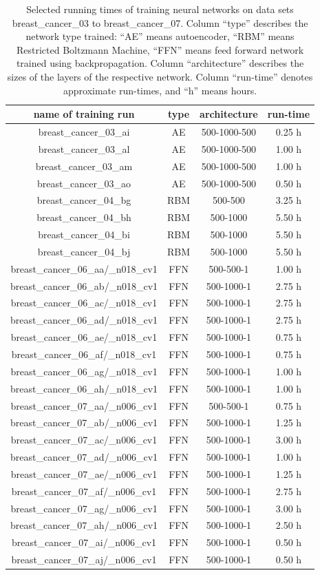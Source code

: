 \begin{table}
\begin{centering}
\begin{tabular}{|c|c|c|c|}
\hline 
name of training run & type & architecture & run-time\tabularnewline
\hline 
\hline 
breast\_cancer\_03\_ai & AE & 500-1000-500 & 0.25 h\tabularnewline
\hline 
breast\_cancer\_03\_al & AE & 500-1000-500 & 1.00 h\tabularnewline
\hline 
breast\_cancer\_03\_am & AE & 500-1000-500 & 1.00 h\tabularnewline
\hline 
breast\_cancer\_03\_ao & AE & 500-1000-500 & 0.50 h\tabularnewline
\hline 
breast\_cancer\_04\_bg & RBM & 500-500 & 3.25 h\tabularnewline
\hline 
breast\_cancer\_04\_bh & RBM & 500-1000 & 5.50 h\tabularnewline
\hline 
breast\_cancer\_04\_bi & RBM & 500-1000 & 5.50 h\tabularnewline
\hline 
breast\_cancer\_04\_bj & RBM & 500-1000 & 5.50 h\tabularnewline
\hline 
breast\_cancer\_06\_aa/\_n018\_cv1 & FFN & 500-500-1 & 1.00 h\tabularnewline
\hline 
breast\_cancer\_06\_ab/\_n018\_cv1 & FFN & 500-1000-1 & 2.75 h\tabularnewline
\hline 
breast\_cancer\_06\_ac/\_n018\_cv1 & FFN & 500-1000-1 & 2.75 h\tabularnewline
\hline 
breast\_cancer\_06\_ad/\_n018\_cv1 & FFN & 500-1000-1 & 2.75 h\tabularnewline
\hline 
breast\_cancer\_06\_ae/\_n018\_cv1 & FFN & 500-1000-1 & 0.75 h\tabularnewline
\hline 
breast\_cancer\_06\_af/\_n018\_cv1 & FFN & 500-1000-1 & 0.75 h\tabularnewline
\hline 
breast\_cancer\_06\_ag/\_n018\_cv1 & FFN & 500-1000-1 & 1.00 h\tabularnewline
\hline 
breast\_cancer\_06\_ah/\_n018\_cv1 & FFN & 500-1000-1 & 1.00 h\tabularnewline
\hline 
breast\_cancer\_07\_aa/\_n006\_cv1 & FFN & 500-500-1 & 0.75 h\tabularnewline
\hline 
breast\_cancer\_07\_ab/\_n006\_cv1 & FFN & 500-1000-1 & 1.25 h\tabularnewline
\hline 
breast\_cancer\_07\_ac/\_n006\_cv1 & FFN & 500-1000-1 & 3.00 h\tabularnewline
\hline 
breast\_cancer\_07\_ad/\_n006\_cv1 & FFN & 500-1000-1 & 1.00 h\tabularnewline
\hline 
breast\_cancer\_07\_ae/\_n006\_cv1 & FFN & 500-1000-1 & 1.25 h\tabularnewline
\hline 
breast\_cancer\_07\_af/\_n006\_cv1 & FFN & 500-1000-1 & 2.75 h\tabularnewline
\hline 
breast\_cancer\_07\_ag/\_n006\_cv1 & FFN & 500-1000-1 & 3.00 h\tabularnewline
\hline 
breast\_cancer\_07\_ah/\_n006\_cv1 & FFN & 500-1000-1 & 2.50 h\tabularnewline
\hline 
breast\_cancer\_07\_ai/\_n006\_cv1 & FFN & 500-1000-1 & 0.50 h\tabularnewline
\hline 
breast\_cancer\_07\_aj/\_n006\_cv1 & FFN & 500-1000-1 & 0.50 h\tabularnewline
\hline 
\end{tabular}
\par\end{centering}
\caption[Running times of training selected neural networks, table 1.]{\label{tab:selected-running-times-table1}Selected running times
of training neural networks on data sets breast\_cancer\_03 to breast\_cancer\_07.
Column ``type'' describes the network type trained: ``AE'' means
autoencoder, ``RBM'' means Restricted Boltzmann Machine, ``FFN''
means feed forward network trained using backpropagation. Column ``architecture''
describes the sizes of the layers of the respective network. Column
``run-time'' denotes approximate run-times, and ``h'' means hours.}
\end{table}


